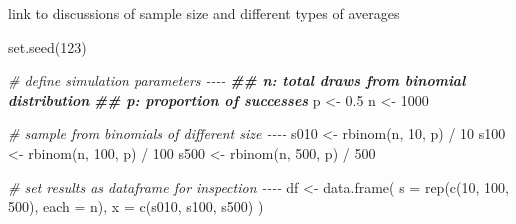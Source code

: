 \documentclass[
]{krantz}
\makeatletter
\newenvironment{Shaded}{\begin{snugshade}}{\end{snugshade}}
\newcommand{\AttributeTok}[1]{\textcolor[rgb]{0.61,0.61,0.61}{#1}}
\newcommand{\CommentTok}[1]{\textcolor[rgb]{0.37,0.37,0.37}{\textit{#1}}}
\newcommand{\DecValTok}[1]{\textcolor[rgb]{0.06,0.06,0.06}{#1}}
\newcommand{\DocumentationTok}[1]{\textcolor[rgb]{0.37,0.37,0.37}{\textbf{\textit{#1}}}}
\newcommand{\FloatTok}[1]{\textcolor[rgb]{0.06,0.06,0.06}{#1}}
\newcommand{\FunctionTok}[1]{\textcolor[rgb]{0,0,0}{#1}}
\newcommand{\NormalTok}[1]{#1}
\newcommand{\OtherTok}[1]{\textcolor[rgb]{0.37,0.37,0.37}{#1}}
\newcommand{\SpecialCharTok}[1]{\textcolor[rgb]{0,0,0}{#1}}
\newenvironment{kframe}{%
\medskip{}
\setlength{\fboxsep}{.8em}
 \def\at@end@of@kframe{}%
 \ifinner\ifhmode%
  \def\at@end@of@kframe{\end{minipage}}%
  \begin{minipage}{\columnwidth}%
 \fi\fi%
 \def\FrameCommand##1{\hskip\@totalleftmargin \hskip-\fboxsep
 \colorbox{shadecolor}{##1}\hskip-\fboxsep
     \hskip-\linewidth \hskip-\@totalleftmargin \hskip\columnwidth}%
 \MakeFramed {\advance\hsize-\width
   \@totalleftmargin\z@ \linewidth\hsize
   \@setminipage}}%
 {\par\unskip\endMakeFramed%
 \at@end@of@kframe}
\renewenvironment{Shaded}{\begin{kframe}}{\end{kframe}}
\makeatother
\begin{document}
link to discussions of sample size and different types of averages

\begin{Shaded}
\begin{Highlighting}[]
\FunctionTok{set.seed}\NormalTok{(}\DecValTok{123}\NormalTok{)}

\CommentTok{\# define simulation parameters {-}{-}{-}{-}}
\DocumentationTok{\#\# n: total draws from binomial distribution}
\DocumentationTok{\#\# p: proportion of successes}
\NormalTok{p }\OtherTok{\textless{}{-}} \FloatTok{0.5}
\NormalTok{n }\OtherTok{\textless{}{-}} \DecValTok{1000}

\CommentTok{\# sample from binomials of different size {-}{-}{-}{-}}
\NormalTok{s010 }\OtherTok{\textless{}{-}} \FunctionTok{rbinom}\NormalTok{(n,  }\DecValTok{10}\NormalTok{, p) }\SpecialCharTok{/}  \DecValTok{10}
\NormalTok{s100 }\OtherTok{\textless{}{-}} \FunctionTok{rbinom}\NormalTok{(n, }\DecValTok{100}\NormalTok{, p) }\SpecialCharTok{/} \DecValTok{100}
\NormalTok{s500 }\OtherTok{\textless{}{-}} \FunctionTok{rbinom}\NormalTok{(n, }\DecValTok{500}\NormalTok{, p) }\SpecialCharTok{/} \DecValTok{500}

\CommentTok{\# set results as dataframe for inspection {-}{-}{-}{-}}
\NormalTok{df }\OtherTok{\textless{}{-}} \FunctionTok{data.frame}\NormalTok{(}
  \AttributeTok{s =} \FunctionTok{rep}\NormalTok{(}\FunctionTok{c}\NormalTok{(}\DecValTok{10}\NormalTok{, }\DecValTok{100}\NormalTok{, }\DecValTok{500}\NormalTok{), }\AttributeTok{each =}\NormalTok{ n),}
  \AttributeTok{x =} \FunctionTok{c}\NormalTok{(s010, s100, s500)}
\NormalTok{)}
\end{Highlighting}
\end{Shaded}
\end{document}
